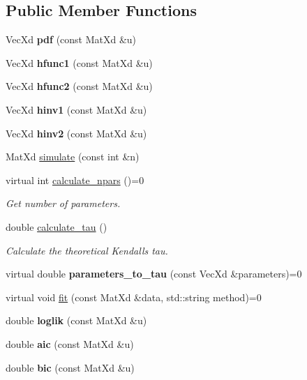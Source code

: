 \subsection*{Public Member Functions}
\begin{DoxyCompactItemize}
\item 
Vec\+Xd {\bfseries pdf} (const Mat\+Xd \&u)
\item 
Vec\+Xd {\bfseries hfunc1} (const Mat\+Xd \&u)
\item 
Vec\+Xd {\bfseries hfunc2} (const Mat\+Xd \&u)
\item 
Vec\+Xd {\bfseries hinv1} (const Mat\+Xd \&u)
\item 
Vec\+Xd {\bfseries hinv2} (const Mat\+Xd \&u)
\item 
Mat\+Xd \hyperlink{class_bicop_afa62d40a17e096cc0f7e769fb2a1285d}{simulate} (const int \&n)
\item 
\mbox{\label{class_bicop_a6c2b1e5e368f4339bd6acac2f32da74e}} 
virtual int \hyperlink{class_bicop_a6c2b1e5e368f4339bd6acac2f32da74e}{calculate\+\_\+npars} ()=0
\begin{DoxyCompactList}\small\item\em Get number of parameters. \end{DoxyCompactList}\item 
\mbox{\label{class_bicop_abe228ece449fb66996f91b0fcfed60d3}} 
double \hyperlink{class_bicop_abe228ece449fb66996f91b0fcfed60d3}{calculate\+\_\+tau} ()
\begin{DoxyCompactList}\small\item\em Calculate the theoretical Kendall\textquotesingle{}s tau. \end{DoxyCompactList}\item 
\mbox{\label{class_bicop_aadd4f372b89a2389348893633ec238ba}} 
virtual double {\bfseries parameters\+\_\+to\+\_\+tau} (const Vec\+Xd \&parameters)=0
\end{DoxyCompactItemize}
\textbf{ }\par
\begin{DoxyCompactItemize}
\item 
virtual void \hyperlink{class_bicop_a0ff40d8054e11ed8aaa4956c7fd84e89}{fit} (const Mat\+Xd \&data, std\+::string method)=0
\item 
\mbox{\label{class_bicop_a994d28aa99b881425f012605aef3ae68}} 
double {\bfseries loglik} (const Mat\+Xd \&u)
\item 
\mbox{\label{class_bicop_adb4aecd877fc32cc857e2477d5bddf9b}} 
double {\bfseries aic} (const Mat\+Xd \&u)
\item 
\mbox{\label{class_bicop_a68ee43f29c026aaf8157673c1ddf29b2}} 
double {\bfseries bic} (const Mat\+Xd \&u)
\end{DoxyCompactItemize}

